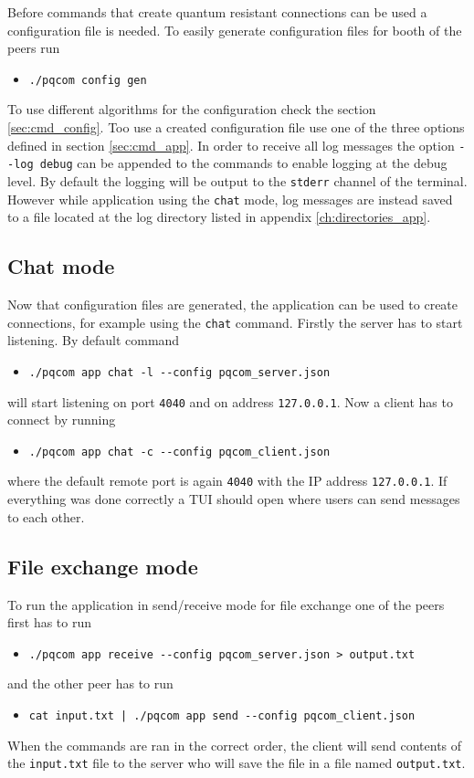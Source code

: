 Before commands that create quantum resistant connections can be used a configuration file is needed. To easily generate configuration files for booth of the peers run
\begin{itemize}
  \item \texttt{./pqcom config gen}
\end{itemize}
To use different algorithms for the configuration check the section \ref{sec:cmd_config}. Too use a created configuration file use one of the three options defined in section \ref{sec:cmd_app}. In order to receive all log messages the option \texttt{-\--log debug} can be appended to the commands to enable logging at the debug level. By default the logging will be output to the \texttt{stderr} channel of the terminal. However while application using the \texttt{chat} mode, log messages are instead saved to a file located at the log directory listed in appendix \ref{ch:directories_app}.

\subsection{Chat mode}
Now that configuration files are generated, the application can be used to create connections, for example using the \texttt{chat} command. Firstly the server has to start listening. By default command
\begin{itemize}
  \item \texttt{./pqcom app chat -l -\--config pqcom\_server.json}
\end{itemize}
will start listening on port \texttt{4040} and on address \texttt{127.0.0.1}. Now a client has to connect by running
\begin{itemize}
  \item \texttt{./pqcom app chat -c -\--config pqcom\_client.json}
\end{itemize}
where the default remote port is again \texttt{4040} with the IP address \texttt{127.0.0.1}. If everything was done correctly a TUI should open where users can send messages to each other.

\subsection{File exchange mode}
To run the application in send/receive mode for file exchange one of the peers first has to run
\begin{itemize}
  \item \texttt{./pqcom app receive -\--config pqcom\_server.json > output.txt}
\end{itemize}
and the other peer has to run
\begin{itemize}
  \item \texttt{cat input.txt | ./pqcom app send -\--config pqcom\_client.json}
\end{itemize}
When the commands are ran in the correct order, the client will send contents of the \texttt{input.txt} file to the server who will save the file in a file named \texttt{output.txt}.

